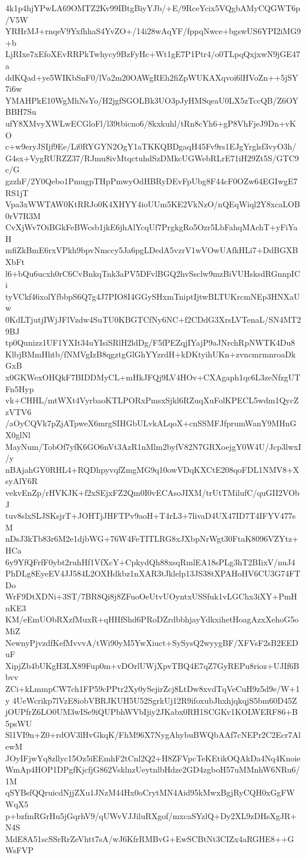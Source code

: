 4k1p4hjYPwLA69OMTZ2Kv99IBtgBiyYJb/+E/9RceYcix5VQgbAMyCQGWT6p/V5W
YRHrMJ+rnqeV9YxfhhaS4YvZO+/14i28wAqYF/fppqNwce+bgswUS6YPI2iMG9+b
LjRIxe7xEfoXEvRRPkTwhycy9BzFyHc+Wt1gE7P1Ptr4/o0TLpqQxjxwN9jGE47a
ddKQad+ye5WIKbSnF0/lVa2m20OAWgREh2fiZpWUKAXqvoi6lHVoZn++5jSY7i6w
YMAHPkE10WgMhNsYo/H2jgfSGOLBk3UO3pJyHMSqeaU0LX5zTccQB/Z6OYBBH7Su
ufY8XMvyXWLwECGloFl/l39tbicno6/8kxkuhl/tRn8cYh6+gP8VhFjeJ9Dn+vKO
c+w9eryJSIjf9Ee/Li0RYGYN2OgY1aTKKQBDgaqH45Fv9rs1EJgYrglsf3vyO3h/
G4sx+VygRURZZ37/RJmu8ivMtqctuhdSzDMkcUGWebRLrE71iH29Zt5S/GTC9c/G
gzzhF/2Y0Qebo1PmugpTHpPmwyOdHBRyDEvFpUbg8F44cF0OZw64EGIwgE7RS1jT
Vpa3xWWTAW0KtRRJo0K4XHYY4ioUUm5KE2VkNzO/nQEqWiql2Y8xcaLOB0rV7R3M
CvXjWv7OiBGkFeBWcsb1jkE6jhAlYcqUf7PrgkgRo5Ozr5LbFahqMAchT+yFiYaH
mfiZkBmE6rxVPkh9bpvNmccy5Ja6pgLDedA5vzrV1wVOwUAfkHLi7+DdBGXBXbFt
l6+bQu6ucxh0rC6CvBnkqTnk3aPV5DFvlBGQ2hvSsclw9mzBiVUHsksdRGnnpICi
tyVCkf46xolYfbbpS6Q7g4J7PIO8I4GGySHxmTniptIjtwBLTUKrcmNEp3HNXaUw
0KdLTjutjIWjJFlVzdw4SuTU0KBGTCfNy6NC+f2CDdG3XrsLVTenaL/SN4MT29BJ
tp0Qunizz1UF1YXIt34uYIsiSRlH2ldDg/F5fPEZqjIYajP9aJNrchRpNWTK4Du8
KlbjBMmHhtb/fNMVgIzB8qgztgGlGhYYzrdH+kDKtyihUKn+zvncmrmnroaDkGxB
x0GKWexOHQkF7BIDDMyCL+mHkJFQj9LV4HOv+CXAgaph1qc6L3zeNfzgUTFn5Hyp
vk+CHHL/mtWXt4VyrbaoKTLPORxPmsxSjkl6RZuqXuFolKPECL5wdm1QycZzVTV6
/aOyCQVk7pZjATpweX6mrgSIHGbULvkALqoX+cnSSMFJfprumWanY9MHnGX0glNl
MayNum/TobOf7yfK6GO6nVt3AzR1nMlm2byfV82N7GRXoejgY0W4U/Jcp3lwxI/y
nBAjahGY0RHL4+RQDhpyvqfZmgMG9q10owVDqKXCtE208qoFDL1NMV8+XsyAlY6R
vekvEnZp/rHVKJK+f2xSEjxFZ2Qm0I0vECAsoJIXM/trUtTMilufC/quGII2VObJ
tuv8slxSLJSKsjrT+JOHTjJHFTPv9aoH+T4rL3+7livaD4UX47ID7T4IFYV477sM
nDsJ3kTb83r6M2e1djbWG+76W4FeTITLRG8xJXbpNrWgt30FtaK8096VZYtz+HCa
6y9YfQFrfF0ybt2ruhHf1VfXcY+CpkydQh88xsqRmlEA18sPLg3hT2BIixV/nuJ4
PhDLg8EyeEV4JJ584L2OXHdkbz1nXAR3tJklelp13JS38tXPAHoHV6CU3G74FTDo
WrF9DtXDNi+3ST/7BR8Qi8j8ZFuoOeUtvUOyntxUSSfuk1vLGChx3iXY+PmHnKE3
KM/eEmUObRXzfMuxR+qHHfShd6PRoDZrdbbhjayYdkxihetHoagAzxXehoG5oMiZ
NewnyPjvzdfKefMvvvA/tWi90yM5YwXiuct+SySysQ2wyygBF/XFVsF2sB2EEDuF
XipjZb4bUKgH3LX89Fup0m+vDOrlUWjXpvTBQ4E7qZ7GyREPu8rioz+UJIf6Bbvv
ZCi+kLmmpCW7ch1FP59cPPtr2Xy0ySejirZcj8LtDw8xvdTqVeCuH9z5d9e/W+1y
4UeWcrikp7lVzE8iobVBRJKUH5U52SgrkUj12R9ifoxubJhxhjqkqjS5bm60D45Z
jOUPfrZ6LO0UM3wISe9iQUPbhWVbIjiy2JKabx0RH1SCGKv1KOLWERF86+B5psWU
Sl1VI9n+Z0+rdOV3lHvGkqK/FhM96X7NygAhybuBWQbAAf7cNEPr2C2Ecr7AlewM
JOyIFjwYq8zllyc15Oz5iEEmhF2tCnl2Q2+H8ZFVpcTeKEtikOQAkDa4Nq4Knoie
WmAp4HOP1DPgfKjcfjG862VsklnzUeytnlbHdze2GD4zgboH57uMMnhW6NRu6/1M
qSYBsfQQruicdNjjZXu1JNzM44Hx0oCrytMN4Aid95kMwxBgjRyCQH0xGgFWWqX5
p+bzfmRGrHu5jGqrhV9/qUWvVJJiluRXgof/mxcaSYzlQ+Dy2XL9zDHsXgJR+N4S
MdE8A51scSSrRrZeVhtt7sA/wJ6KfrRMBvG+EwSCBtNt3CIZx4aRGHE8++GWsFVP
